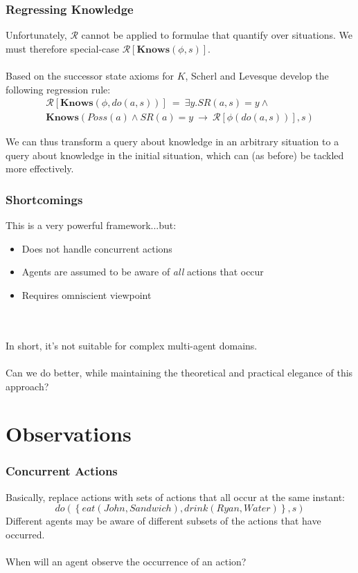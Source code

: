 \documentclass{beamer}
\begin{document}
\begin{frame}
\frametitle{Regressing Knowledge}
Unfortunately, $\mathcal{R}$ cannot be applied to formulae that quantify
over situations.  We must therefore special-case
$\mathcal{R}[\mathbf{Knows}(\phi,s)]$.
\ \\
\ \\
Based on the successor state axioms for $K$, Scherl and Levesque develop
the following regression rule:
\begin{multline*}
  \mathcal{R}[\mathbf{Knows}(\phi,do(a,s))]\ =\ 
    \exists y . SR(a,s) = y \wedge \\
    \mathbf{Knows}(Poss(a) \wedge SR(a)=y\ \rightarrow\ \mathcal{R}[\phi(do(a,s))],s)
\end{multline*}

We can thus transform a query about knowledge in an arbitrary situation to
a query about knowledge in the initial situation, which can (as before) be
tackled more effectively.

\end{frame}

\begin{frame}
\frametitle{Shortcomings}
This is a very powerful framework...but:
\begin{itemize}
 \item Does not handle concurrent actions
 \item Agents are assumed to be aware of \emph{all} actions that occur
 \item Requires omniscient viewpoint
\end{itemize}
\ \\
\ \\
\pause
In short, it's not suitable for complex multi-agent domains.
\ \\
\ \\
Can we do better, while maintaining the theoretical and practical elegance
of this approach?
\end{frame}

\section{Observations}

\begin{frame}
\frametitle{Concurrent Actions}
Basically, replace actions with sets of actions that all occur at the same
instant:
\begin{equation*}
  do(\left\{eat(John,Sandwich),drink(Ryan,Water)\right\},s)
\end{equation*}
\pause
Different agents may be aware of different subsets of the actions that
have occurred.
\ \\
\ \\
When will an agent observe the occurrence of an action?
\end{frame}
\end{document}
